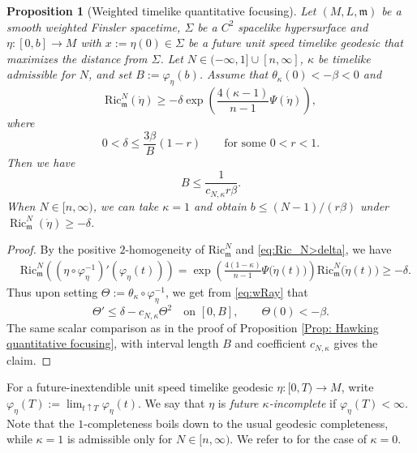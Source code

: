 \documentclass[a4paper,11pt]{article}
\numberwithin{equation}{section}
\theoremstyle{definition}
\theoremstyle{plain}
\newtheorem{Proposition}[Definition]{Proposition}
\newcommand{\Ric}{\mathrm{Ric}}
\newcommand{\m}{\mathfrak m}
\begin{document}
\begin{Proposition}[Weighted timelike quantitative focusing]
\label{Prop: weighted timelike quant focusing}
Let $(M,L,\mathfrak m)$ be a smooth weighted Finsler spacetime, $\Sigma$ be a $C^2$ spacelike hypersurface and $\eta:[0,b]\to M$ with
$x := \eta(0) \in \Sigma$ be a future unit speed timelike geodesic that maximizes the distance from $\Sigma$. 
Let $N\in(-\infty,1]\cup[n,\infty]$, $\kappa$ be timelike admissible for $N$, and set $B:=\varphi_\eta(b)$. 
Assume that $\theta_\kappa(0)<-\beta<0$ and
\begin{equation}
\label{eq:Ric_N>delta}
    \Ric^N_{\mathfrak m}(\dot\eta)
    \geq
    -\delta\exp\left(
        \frac{4(\kappa-1)}{n-1}\Psi(\dot\eta)
    \right),
\end{equation}
where
\[
    0<\delta\leq\frac{3\beta}{B}(1-r)
    \qquad\text{for some }0<r<1.
\]
Then we have 
\[
    B\leq\frac1{c_{N,\kappa}r\beta}.
\]
When $N\in[n,\infty)$, we can take $\kappa=1$ and obtain
$b\leq(N-1)/(r\beta)$ under
$\operatorname{Ric}^N_{\mathfrak m}(\dot\eta)\geq-\delta$.
\end{Proposition}

\begin{proof}
By the positive $2$-homogeneity of $\Ric^N_\m$ and \eqref{eq:Ric_N>delta}, we have 
\[
\begin{aligned}
    &\Ric^N_{\mathfrak m}
    \left(
        (\eta\circ\varphi_\eta^{-1})'
        (\varphi_\eta(t))
    \right)=
    \exp\left(
        \frac{4(1-\kappa)}{n-1}\Psi\bigl(\dot\eta(t)\bigr)
    \right)
    \Ric^N_{\mathfrak m}\bigl(\dot\eta(t)\bigr) \ge -\delta.
\end{aligned}
\]
Thus upon setting
$\Theta:=\theta_\kappa\circ\varphi_\eta^{-1}$, we get from \eqref{eq:wRay} that
\[
    \Theta'\leq\delta-c_{N,\kappa}\Theta^2
    \quad\text{on }[0,B],
    \qquad
    \Theta(0)<-\beta.
\]
The same scalar comparison as in the proof of Proposition \ref{Prop: Hawking quantitative focusing}, with interval length $B$ and coefficient
$c_{N,\kappa}$ gives the claim. 
\end{proof}

For a future-inextendible unit speed timelike geodesic $\eta:[0,T)\to M$, write $\varphi_\eta(T) :=\lim_{t\uparrow T}\varphi_\eta(t)$.
We say that $\eta$ is \emph{future $\kappa$-incomplete} if $\varphi_\eta(T)<\infty$. 
Note that the $1$-completeness boils down to the usual geodesic completeness, while $\kappa=1$ is admissible only for $N \in [n,\infty)$. 
We refer to \cite{WW16,WW18} for the case of $\kappa=0$.
\end{document}
